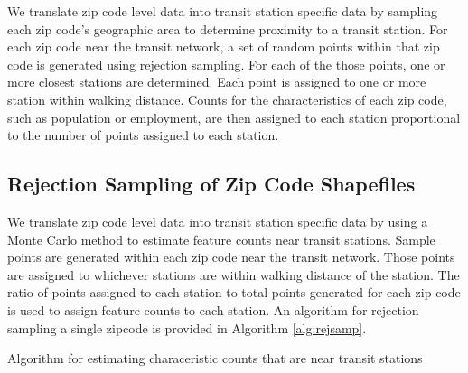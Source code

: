 \documentclass[11pt]{article}
\begin{document}
We translate zip code level data into transit station specific data by sampling each zip code's geographic area to determine proximity to a transit station. For each zip code near the transit network, a set of random points within that zip code is generated using rejection sampling. For each of the those points, one or more closest stations are determined. Each point is assigned to one or more station within walking distance. Counts for the characteristics of each zip code, such as population or employment, are then assigned to each station proportional to the number of points assigned to each station.

\subsection{Rejection Sampling of Zip Code Shapefiles}

We translate zip code level data into transit station specific data by using a Monte Carlo method to estimate feature counts near transit stations. Sample points are generated within each zip code near the transit network. Those points are assigned to whichever stations are within walking distance of the station. The ratio of points assigned to each station to total points generated for each zip code is used to assign feature counts to each station. An algorithm for rejection sampling a single zipcode is provided in Algorithm \ref{alg:rejsamp}.


\begin{algorithm}\begingroup\fontsize{10}{10}\selectfont
\begin{algorithmic}
		\EndFor
		\EndFor
	\EndIf
\EndFor
\end{algorithmic}\endgroup\caption{Algorithm for estimating characeristic counts that are near transit stations}\label{alg:rejsamp}
\end{algorithm}
\end{document}
